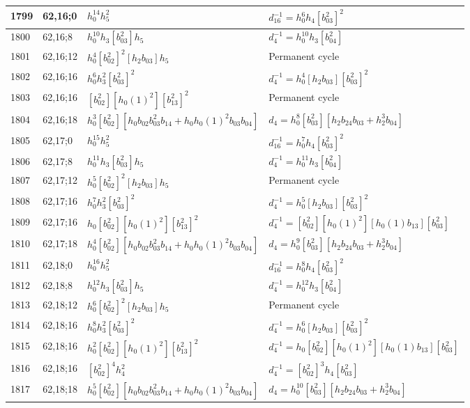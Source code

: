 \documentclass{article}
\begin{document}
\begin{longtable}{|l|l|>{\raggedright\arraybackslash}p{6cm}|>{\raggedright\arraybackslash}p{6cm}|}
\hline
1799 & 62,16;0 & $h_0^{14}h_5^2$ & $d_{16}^{-1}=h_0^6h_4[b_{03}^2]^2$\\
\hline
1800 & 62,16;8 & $h_0^{10}h_3[b_{03}^2]h_5$ & $d_{4}^{-1}=h_0^{10}h_3[b_{04}^2]$\\
\hline
1801 & 62,16;12 & $h_0^4[b_{02}^2]^2[h_2b_{03}]h_5$ & Permanent cycle\\
\hline
1802 & 62,16;16 & $h_0^6h_3^2[b_{03}^2]^2$ & $d_{4}^{-1}=h_0^4[h_2b_{03}][b_{03}^2]^2$\\
1803 & 62,16;16 & $[b_{02}^2][h_0(1)^2][b_{13}^2]^2$ & Permanent cycle\\
\hline
1804 & 62,16;18 & $h_0^3[b_{02}^2][h_0b_{02}b_{03}^2b_{14} + h_0h_0(1)^2b_{03}b_{04}]$ &$d_{4}=h_0^8[b_{03}^2][h_2b_{24}b_{03} + h_2^3b_{04}]$\\
\hline
1805 & 62,17;0 & $h_0^{15}h_5^2$ & $d_{16}^{-1}=h_0^7h_4[b_{03}^2]^2$\\
\hline
1806 & 62,17;8 & $h_0^{11}h_3[b_{03}^2]h_5$ & $d_{4}^{-1}=h_0^{11}h_3[b_{04}^2]$\\
\hline
1807 & 62,17;12 & $h_0^5[b_{02}^2]^2[h_2b_{03}]h_5$ & Permanent cycle\\
\hline
1808 & 62,17;16 & $h_0^7h_3^2[b_{03}^2]^2$ & $d_{4}^{-1}=h_0^5[h_2b_{03}][b_{03}^2]^2$\\
1809 & 62,17;16 & $h_0[b_{02}^2][h_0(1)^2][b_{13}^2]^2$ & $d_{4}^{-1}=[b_{02}^2][h_0(1)^2][h_0(1)b_{13}][b_{03}^2]$\\
\hline
1810 & 62,17;18 & $h_0^4[b_{02}^2][h_0b_{02}b_{03}^2b_{14} + h_0h_0(1)^2b_{03}b_{04}]$ &$d_{4}=h_0^9[b_{03}^2][h_2b_{24}b_{03} + h_2^3b_{04}]$\\
\hline
1811 & 62,18;0 & $h_0^{16}h_5^2$ & $d_{16}^{-1}=h_0^8h_4[b_{03}^2]^2$\\
\hline
1812 & 62,18;8 & $h_0^{12}h_3[b_{03}^2]h_5$ & $d_{4}^{-1}=h_0^{12}h_3[b_{04}^2]$\\
\hline
1813 & 62,18;12 & $h_0^6[b_{02}^2]^2[h_2b_{03}]h_5$ & Permanent cycle\\
\hline
1814 & 62,18;16 & $h_0^8h_3^2[b_{03}^2]^2$ & $d_{4}^{-1}=h_0^6[h_2b_{03}][b_{03}^2]^2$\\
1815 & 62,18;16 & $h_0^2[b_{02}^2][h_0(1)^2][b_{13}^2]^2$ & $d_{4}^{-1}=h_0[b_{02}^2][h_0(1)^2][h_0(1)b_{13}][b_{03}^2]$\\
1816 & 62,18;16 & $[b_{02}^2]^4h_4^2$ & $d_{4}^{-1}=[b_{02}^2]^3h_4[b_{03}^2]$\\
\hline
1817 & 62,18;18 & $h_0^5[b_{02}^2][h_0b_{02}b_{03}^2b_{14} + h_0h_0(1)^2b_{03}b_{04}]$ &$d_{4}=h_0^{10}[b_{03}^2][h_2b_{24}b_{03} + h_2^3b_{04}]$\\

\end{longtable}
\end{document}
